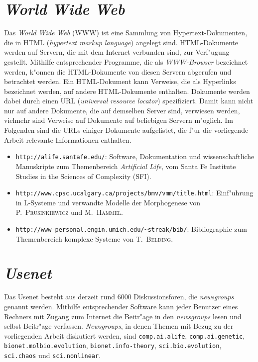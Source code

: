 \begin{appendix}
\section{\textsl{World Wide Web}}

Das \textsl{World Wide Web} (WWW) ist eine Sammlung von Hypertext-Dokumenten, die in HTML
(\textsl{hypertext markup language}) angelegt sind. HTML-Dokumente werden auf Servern,
die mit dem Internet verbunden sind, zur Verf"ugung gestellt.
Mithilfe entsprechender Programme,
die als \textsl{WWW-Browser} bezeichnet werden, k"onnen die HTML-Dokumente von diesen
Servern abgerufen und betrachtet werden.  Ein HTML-Dokument kann
Verweise, die als Hyperlinks bezeichnet werden, auf andere HTML-Dokumente enthalten.
Dokumente werden dabei durch einen URL (\textsl{universal resource locator}) spezifiziert.
Damit kann nicht nur auf andere Dokumente, die auf demselben Server sind, verwiesen
werden, vielmehr sind Verweise auf Dokumente auf beliebigen Servern m"oglich. 
Im Folgenden sind die URLs einiger Dokumente aufgelistet, die f"ur die vorliegende Arbeit
relevante Informationen enthalten.

\begin{itemize}

\item \verb|http://alife.santafe.edu/|: Software, Dokumentation und wissenschaftliche Manuskripte
zum Themenbereich \textsl{Artificial Life}, vom Santa Fe Institute Studies in the Sciences of Complexity (SFI).

\item \verb|http://www.cpsc.ucalgary.ca/projects/bmv/vmm/title.html|: Einf"uhrung in L-Systeme und
verwandte Modelle der Morphogenese von \textsc{P.\ Prusinkiewicz} und \textsc{M.\ Hammel}.

\item \verb|http://www-personal.engin.umich.edu/~streak/bib/|: Bibliographie zum Themenbereich komplexe
Systeme von \textsc{T.\ Belding}.

\end{itemize}


\section{\textsl{Usenet}}

Das Usenet besteht aus derzeit rund 6000 Diskussionsforen, die {\slshape newsgroups}
genannt werden. Mithilfe entsprechender Software kann jeder Benutzer eines
Rechners mit Zugang zum Internet die Beitr"age in den {\slshape newsgroups}
lesen und selbst Beitr"age verfassen. \textsl{Newsgroups}, in denen Themen mit Bezug
zu der vorliegenden Arbeit diskutiert werden, sind \verb|comp.ai.alife|, \verb|comp.ai.genetic|,
\verb|bionet.molbio.evolution|, \verb|bionet.info-theory|, \verb|sci.bio.evolution|, 
\verb|sci.chaos| und \verb|sci.nonlinear|.




\end{appendix}
